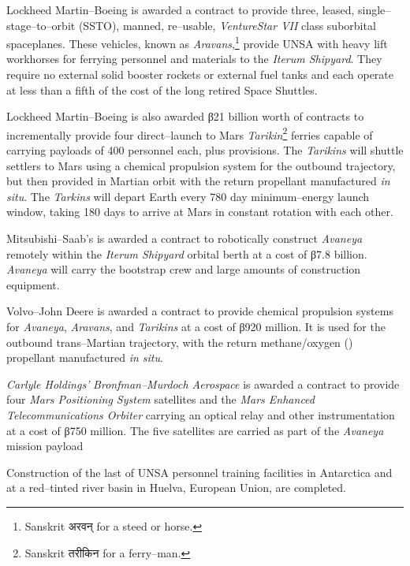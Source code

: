 Lockheed Martin--Boeing is awarded a contract to provide three, leased, single--stage--to--orbit (SSTO), manned, re--usable, {\it VentureStar VII} class suborbital spaceplanes. These vehicles, known as {\it Aravans},\footnote{Sanskrit अरवन् for a steed or horse.} provide UNSA with heavy lift workhorses for ferrying personnel and materials to the {\it Iterum Shipyard}. They require no external solid booster rockets or external fuel tanks and each operate at less than a fifth of the cost of the long retired Space Shuttles.

Lockheed Martin--Boeing is also awarded β21 billion worth of contracts to incrementally provide four direct--launch to Mars {\it Tarikin}\footnote{Sanskrit तरीकिन for a ferry--man.} ferries capable of carrying payloads of 400 personnel each, plus provisions. The {\it Tarikins} will shuttle settlers to Mars using a chemical  propulsion system for the outbound trajectory, but then provided in Martian orbit with the return  propellant manufactured {\it in situ}. The {\it Tarkins} will depart Earth every 780 day minimum--energy launch window, taking 180 days to arrive at Mars in constant rotation with each other.

Mitsubishi--Saab's is awarded a contract to robotically construct {\it Avaneya} remotely within the {\it Iterum Shipyard} orbital berth at a cost of β7.8 billion. {\it Avaneya} will carry the bootstrap crew and large amounts of construction equipment.

Volvo--John Deere is awarded a contract to provide chemical propulsion systems for {\it Avaneya}, {\it Aravans}, and {\it Tarikins} at a cost of β920 million. It is used for the outbound trans--Martian trajectory, with the return methane/oxygen () propellant manufactured {\it in situ}.

{\it Carlyle Holdings'} {\it Bronfman--Murdoch Aerospace} is awarded a contract to provide four {\it Mars Positioning System} satellites and the {\it Mars Enhanced Telecommunications Orbiter} carrying an optical relay and other instrumentation at a cost of β750 million. The five satellites are carried as part of the {\it Avaneya} mission payload
\StopTimelineDate

Construction of the last of UNSA personnel training facilities in Antarctica and at a red--tinted river basin in Huelva, European Union, are completed.
\StopTimelineDate

